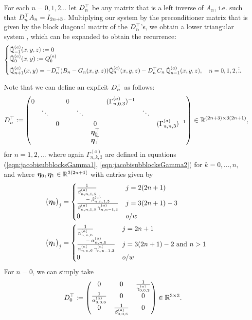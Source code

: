 \documentclass[11pt, oneside]{article}   	%
\begin{document}
For each $n = 0,1,2\dots$ let $D^\top_n$ be any matrix that is a left inverse of $A_n$, i.e. such that $D^\top_n A_n = I_{2n+3}$. Multiplying our system by the preconditioner matrix that is given by the block diagonal matrix of the $D^\top_n$'s, we obtain a lower triangular system \cite[p78]{dunkl2014orthogonal}, which can be expanded to obtain the recurrence:
\begin{align*}
	\begin{cases}
		\mathbb{\tilde{Q}}^{(a)}_{-1}(x,y,z) := 0 \\
		\mathbb{\tilde{Q}}^{(a)}_{0}(x,y) := Q^{(a)}_0 \\
		\mathbb{\tilde{Q}}^{(a)}_{n+1}(x,y) = -D^\top_n (B_n-G_n(x,y,z)) \mathbb{\tilde{Q}}^{(a)}_n(x,y,z) - D^\top_n C_n  \, \mathbb{\tilde{Q}}^{(a)}_{n-1}(x,y,z), \quad n = 0,1,2,\vdots.
	\end{cases}
\end{align*}

Note that we can define an explicit $D^\top_n$ as follows:
\begin{align*}
	D^\top_n := 
		\begin{pmatrix}
			0 & & & 0 & & & (\Gamma^{(a)}_{n,0,3})^{-1} & & \\
			& \ddots & & & \ddots & & & \ddots \\
			& & 0 & & & 0 & & & (\Gamma^{(a)}_{n,n,3})^{-1}  \\
			& & & & & \bm{\eta}^\top_{0} & & & \\
			& & & & & \bm{\eta}^\top_{1} & & &
		\end{pmatrix} \in \mathbb{R}^{(2n+3)\times3(2n+1)},
\end{align*}
for $n = 1, 2, \dots$ where again $\Gamma^{(a)}_{n,k,3}$ are defined in equations (\ref{eqn:jacobisubblocksGamma1}, \ref{eqn:jacobisubblocksGamma2}) for $k=0,\dots,n$, and where $\bm{\eta}_{0}, \bm{\eta}_{1} \in \mathbb{R}^{3(2n+1)}$ with entries given by 
\begin{align*}
	\big(\bm{\eta}_{0}\big)_j &= 
		\begin{cases}
			\frac{1}{\beta^{(a)}_{n,n,1,6}} & j = 2(2n+1) \\
			\frac{- \: \beta^{(a)}_{n,n,1,5}}{\beta^{(a)}_{n,n,1,6} \: \gamma^{(a)}_{n, n-1, 3}} & j = 3(2n+1) - 3 \\
			0 & o/w
		\end{cases} \\
	\big(\bm{\eta}_{1}\big)_j &= 
		\begin{cases}
			\frac{1}{\alpha^{(a)}_{n,n,6}} & j = 2n+1 \\
			\frac{- \: \alpha^{(a)}_{n,n,5}}{\alpha^{(a)}_{n,n,6} \: \gamma^{(a)}_{n, n-1, 3}} & j = 3(2n+1) - 2  \text{ and } n > 1 \\
			0 & o/w
		\end{cases}
\end{align*}
For $n=0$, we can simply take
\begin{align*}
	D^\top_0 &:= 
		\begin{pmatrix}
			0 & 0 & \frac{1}{\gamma^{(a)}_{0,0,3}} \\
			\frac{1}{\alpha^{(a)}_{0,0,6}} & 0 & 0 \\
			0 & \frac{1}{\beta^{(a)}_{0,0,6}} & 0
		\end{pmatrix} \in \mathbb{R}^{3\times3}.
\end{align*}
\end{document}
